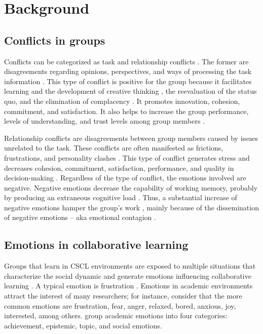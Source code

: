 \documentclass[3p,times,preprint]{elsarticle}
\begin{document}
{
\section{Background}\label{backgorund}
\subsection{Conflicts in groups}


Conflicts can be categorized as task and relationship conflicts \citep{Jehn1997}. The former are disagreements regarding opinions, perspectives, and ways of processing the task information
\citep{Ayoko2008,Garcia-Prieto2007,Lee2015}. This type of conflict is positive for the group because it facilitates learning and the development of creative thinking \citep{Jiang2013}, the reevaluation of the status quo, and the elimination of complacency \citep{Ayoko2008}. It promotes innovation, cohesion, commitment, and satisfaction.  It also helps to increase the group performance, levels of understanding, and trust levels among group members  \citep{Dreu2003,Jehn1997,Lee2015,Garcia-Prieto2007}.

Relationship conflicts are disagreements between group members caused by issues unrelated to the task. These conflicts are often manifested as frictions, frustrations, and personality clashes \citep{Ayoko2008,Garcia-Prieto2007,Jehn2001}. This type of conflict generates stress and decreases cohesion, commitment, satisfaction, performance, and quality in decision-making \citep{Naykki2014,Dreu2003,Jehn1997,Lee2015}.
Regardless of the type of conflict, the emotions involved are negative. Negative emotions decrease the capability of working memory, probably by producing an extraneous cognitive load \citep{Dreu2003}. Thus, a substantial increase of negative emotions hamper the group's work \citep{Dreu2003,Jehn1997,Jiang2013,Lee2015}, mainly because of the  dissemination of negative emotions
-- aka emotional contagion \citep{Barsade2009}.

\subsection{Emotions in collaborative learning}
Groups that learn in CSCL environments are exposed to multiple situations that characterize the social dynamic and generate emotions influencing collaborative learning \citep{Jarvela2013}. A typical emotion is frustration \citep{Capdeferro2012}. Emotions in academic environments attract the interest of many researchers; for instance, \cite{Reis2018} consider that the more common emotions are frustration, fear, anger, relaxed, bored, anxious, joy, interested, among others. \cite{Pekrun2002} group academic emotions into four categories: achievement, epistemic,  topic, and social emotions.



}
\end{document}
